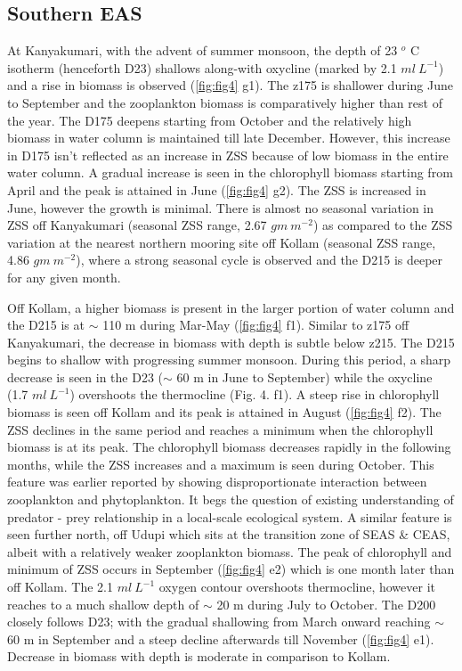 \documentclass{article}
\begin{document}
	\subsection{Southern EAS}
	At Kanyakumari, with the advent of summer monsoon, the depth of 23 $^o$ C isotherm (henceforth D23) shallows along-with oxycline (marked by 2.1 $ml \ L^{-1}$) and a rise in biomass is observed (\cref{fig:fig4} g1). The z175 is shallower during June to September and the zooplankton biomass is comparatively higher than rest of the year. The D175 deepens starting from October and the relatively high biomass in water column is maintained till late December. However, this increase in D175 isn't reflected as an increase in ZSS because of low biomass in the entire water column. A gradual increase is seen in the chlorophyll biomass starting from April and the peak is attained in June (\cref{fig:fig4} g2). The ZSS is increased in June, however the growth is minimal. There is almost no seasonal variation in ZSS off Kanyakumari (seasonal ZSS range, 2.67 $gm\ m^{-2}$) as compared to the ZSS variation at the nearest northern mooring site off Kollam (seasonal ZSS range, 4.86 $gm\ m^{-2}$), where a strong seasonal cycle is observed and the D215 is deeper for any given month.
	
	Off Kollam, a higher biomass is present in the larger portion of water column and the D215 is at $\sim$ 110 m during Mar-May (\cref{fig:fig4} f1). Similar to z175 off Kanyakumari, the decrease in biomass with depth is subtle below z215. The D215 begins to shallow with progressing summer monsoon. During this period, a sharp decrease is seen in the D23 ($\sim$ 60 m in June to September) while the oxycline (1.7 $ml \ L^{-1}$) overshoots the thermocline (Fig. 4. f1). A steep rise in chlorophyll biomass is seen off Kollam and its peak is attained in August (\cref{fig:fig4} f2). The ZSS declines in the same period and reaches a minimum when the chlorophyll biomass is at its peak. The chlorophyll biomass decreases rapidly in the following months, while the ZSS increases and a maximum is seen during October. This feature was earlier reported by \citep{aparna2022seasonal} showing disproportionate interaction between zooplankton and phytoplankton. It begs the question of existing understanding of predator - prey relationship in a local-scale ecological system. A similar feature is seen further north, off Udupi which sits at the transition zone of SEAS \& CEAS, albeit with a relatively weaker zooplankton biomass. The peak of chlorophyll and minimum of ZSS occurs in September (\cref{fig:fig4} e2) which is one month later than off Kollam. The 2.1 $ml \ L^{-1}$  oxygen contour overshoots thermocline, however it reaches to a much shallow depth of $\sim$ 20 m during July to October. The D200 closely follows D23; with the gradual shallowing from March onward reaching $\sim$ 60 m in September and a steep decline afterwards till November (\cref{fig:fig4} e1). Decrease in biomass with depth is moderate in comparison to Kollam.
	
\end{document}
